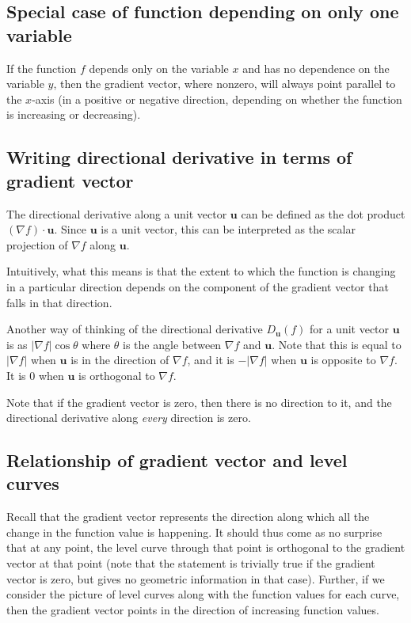 \documentclass[10pt]{amsart}
\begin{document}
\subsection{Special case of function depending on only one variable}

If the function $f$ depends only on the variable $x$ and has no
dependence on the variable $y$, then the gradient vector, where
nonzero, will always point parallel to the $x$-axis (in a positive or
negative direction, depending on whether the function is increasing or
decreasing).

\subsection{Writing directional derivative in terms of gradient vector}

The directional derivative along a unit vector $\mathbf{u}$ can be
defined as the dot product $(\nabla f) \cdot \mathbf{u}$. Since
$\mathbf{u}$ is a unit vector, this can be interpreted as the scalar
projection of $\nabla f$ along $\mathbf{u}$.

Intuitively, what this means is that the extent to which the function
is changing in a particular direction depends on the component of the
gradient vector that falls in that direction.

Another way of thinking of the directional derivative
$D_{\mathbf{u}}(f)$ for a unit vector $\mathbf{u}$ is as $|\nabla
f|\cos \theta$ where $\theta$ is the angle between $\nabla f$ and
$\mathbf{u}$. Note that this is equal to $|\nabla f|$ when
$\mathbf{u}$ is in the direction of $\nabla f$, and it is $-|\nabla
f|$ when $\mathbf{u}$ is opposite to $\nabla f$. It is $0$ when
$\mathbf{u}$ is orthogonal to $\nabla f$.

Note that if the gradient vector is zero, then there is no direction
to it, and the directional derivative along {\em every} direction is
zero.
\subsection{Relationship of gradient vector and level curves}

Recall that the gradient vector represents the direction along which
all the change in the function value is happening. It should thus come
as no surprise that at any point, the level curve through that point
is orthogonal to the gradient vector at that point (note that the
statement is trivially true if the gradient vector is zero, but gives
no geometric information in that case). Further, if we consider the
picture of level curves along with the function values for each curve,
then the gradient vector points in the direction of increasing
function values.
\end{document}
